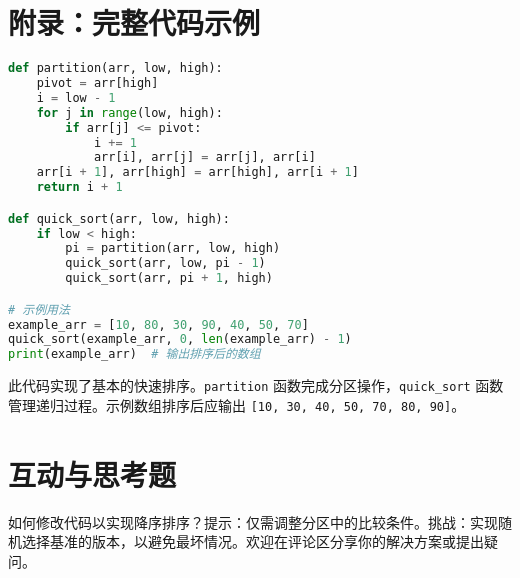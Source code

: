 \chapter{附录：完整代码示例}
\begin{lstlisting}[language=python]
def partition(arr, low, high):
    pivot = arr[high]
    i = low - 1
    for j in range(low, high):
        if arr[j] <= pivot:
            i += 1
            arr[i], arr[j] = arr[j], arr[i]
    arr[i + 1], arr[high] = arr[high], arr[i + 1]
    return i + 1

def quick_sort(arr, low, high):
    if low < high:
        pi = partition(arr, low, high)
        quick_sort(arr, low, pi - 1)
        quick_sort(arr, pi + 1, high)

# 示例用法
example_arr = [10, 80, 30, 90, 40, 50, 70]
quick_sort(example_arr, 0, len(example_arr) - 1)
print(example_arr)  # 输出排序后的数组
\end{lstlisting}
此代码实现了基本的快速排序。\texttt{partition} 函数完成分区操作，\texttt{quick\_{}sort} 函数管理递归过程。示例数组排序后应输出 \texttt{[10, 30, 40, 50, 70, 80, 90]}。\par
\chapter{互动与思考题}
如何修改代码以实现降序排序？提示：仅需调整分区中的比较条件。挑战：实现随机选择基准的版本，以避免最坏情况。欢迎在评论区分享你的解决方案或提出疑问。\par
